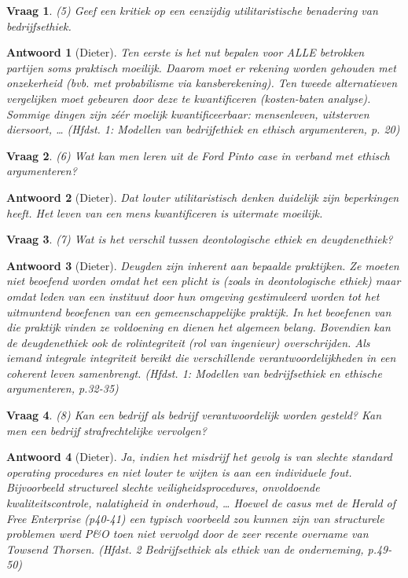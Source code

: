 \documentclass{article}
\theoremstyle{nonumberplain}
\newtheorem{question}{Vraag}
\newtheorem{answer}{Antwoord}
\begin{document}
\begin{question}
(5)	Geef een kritiek op een eenzijdig utilitaristische benadering van bedrijfsethiek.
\end{question}
\begin{answer}[Dieter]
	Ten eerste is het nut bepalen voor ALLE betrokken partijen soms praktisch moeilijk. Daarom moet er rekening worden gehouden met onzekerheid (bvb. met probabilisme via kansberekening).
	Ten tweede alternatieven vergelijken moet gebeuren door deze te kwantificeren (kosten-baten analyse). Sommige dingen zijn z\'e\'er moelijk kwantificeerbaar: mensenleven, uitsterven diersoort, \ldots
	\textit{(Hfdst. 1: Modellen van bedrijfethiek en ethisch argumenteren, p. 20)}
\end{answer}

\begin{question}
(6)	Wat kan men leren uit de Ford Pinto case in verband met ethisch argumenteren?
\end{question}
\begin{answer}[Dieter]
	Dat louter utilitaristisch denken duidelijk zijn beperkingen heeft.
	Het leven van een mens kwantificeren is uitermate moeilijk.
\end{answer}

\begin{question}
(7)	Wat is het verschil tussen deontologische ethiek en deugdenethiek?
\end{question}
\begin{answer}[Dieter]
	Deugden zijn inherent aan bepaalde praktijken.
	Ze moeten niet beoefend worden omdat het een plicht is (zoals in deontologische ethiek) maar omdat leden van een instituut door hun omgeving gestimuleerd worden tot het uitmuntend beoefenen van een gemeenschappelijke praktijk.
	In het beoefenen van die praktijk vinden ze voldoening en dienen het algemeen belang.
	Bovendien kan de deugdenethiek ook de rolintegriteit (rol van ingenieur) overschrijden.
	Als iemand integrale integriteit bereikt die verschillende verantwoordelijkheden in een coherent leven samenbrengt.
	\textit{(Hfdst. 1: Modellen van bedrijfsethiek en ethische argumenteren, p.32-35)}
\end{answer}

\begin{question}
(8)	Kan een bedrijf als bedrijf verantwoordelijk worden gesteld? Kan men een bedrijf strafrechtelijke vervolgen?
\end{question}
\begin{answer}[Dieter]
	Ja, indien het misdrijf het gevolg is van slechte \emph{standard operating procedures} en niet louter te wijten is aan een individuele fout.
	Bijvoorbeeld structureel slechte veiligheidsprocedures, onvoldoende kwaliteitscontrole, nalatigheid in onderhoud, \ldots
	Hoewel de casus met de Herald of Free Enterprise \textit{(p40-41)} een typisch voorbeeld zou kunnen zijn van structurele problemen werd P\&O toen niet vervolgd door de zeer recente overname van Towsend Thorsen.
	\textit{(Hfdst. 2 Bedrijfsethiek als ethiek van de onderneming, p.49-50)}
\end{answer}
\end{document}
